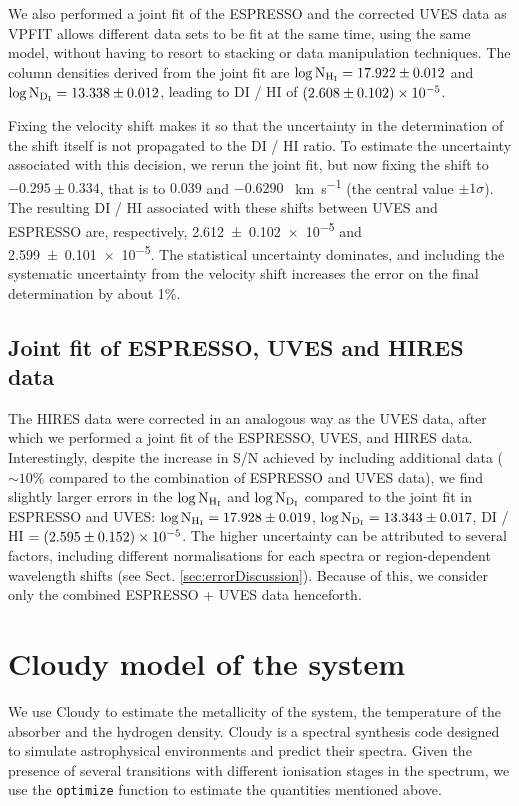 \documentclass[fleqn,usenatbib]{mnras}
\makeatletter
\DeclareRobustCommand{\ion}[2]{%
  \mbox{#1\check@mathfonts\fontsize\sf@size\z@\selectfont #2}%
}
\DeclareRobustCommand{\kms}[1]{\SI{#1}{\km\per\second}}
\makeatother
\begin{document}
We also performed a joint fit of the ESPRESSO and the corrected UVES data as VPFIT allows different data sets to be fit at the same time, using the same model, without having to resort to stacking or data manipulation techniques. The column densities derived from the joint fit are $\log{\rm N_{H_{I}}} = \num{17.922 \pm 0.012}$ and $\log{\rm N_{D_I}} = \num{13.338 \pm 0.012}$, leading to \ion{D}{I}/\ion{H}{I}  of $\num{2.608 \pm 0.102e-5}$.

Fixing the velocity shift makes it so that the uncertainty in the determination of the shift itself is not propagated to the \ion{D}{I}/\ion{H}{I} ratio. To estimate the uncertainty associated with this decision, we rerun the joint fit, but now fixing the shift to $-0.295 \pm 0.334$, that is to $0.039$ and $-0.6290$ \kms{} (the central value $\pm 1\sigma$). The resulting \ion{D}{I}/\ion{H}{I} associated with these shifts between UVES and ESPRESSO are, respectively, \num{2.612 \pm 0.102e-5} and \num{2.599 \pm 0.101e-5}. The statistical uncertainty dominates, and including the systematic uncertainty from the velocity shift increases the error on the final determination by about 1\%.

\subsection{Joint fit of ESPRESSO, UVES and HIRES data}
\label{sect:modelOnHIRES}
The HIRES data were corrected in an analogous way as the UVES data, after which we performed a joint fit of the ESPRESSO, UVES, and HIRES data. Interestingly, despite the increase in S/N achieved by including additional data ($\sim10$\% compared to the combination of ESPRESSO and UVES data), we find slightly larger errors in the $\log{\rm N_{H_{I}}}$ and $\log{\rm N_{D_{I}}}$ compared to the joint fit in ESPRESSO and UVES: $\log{\rm N_{H_I}} = \num{17.928 \pm 0.019}$, $\log{\rm N_{D_I}} = \num{13.343 \pm 0.017}$, \ion{D}{I}/\ion{H}{I} $ = \num{2.595\pm0.152e-5}$. The higher uncertainty can be attributed to several factors, including different normalisations for each spectra or region-dependent wavelength shifts (see Sect. \ref{sec:errorDiscussion}).
Because of this, we consider only the combined ESPRESSO + UVES data henceforth.

\section{Cloudy model of the system}
\label{sec:cloudyModel}
We use Cloudy \citep{cloudy_17} to estimate the metallicity of the system, the temperature of the absorber and the hydrogen density. Cloudy is a spectral synthesis code designed to simulate astrophysical environments and predict their spectra.
Given the presence of several transitions with different ionisation stages in the spectrum, we use the \texttt{optimize} function to estimate the quantities mentioned above.
\end{document}
